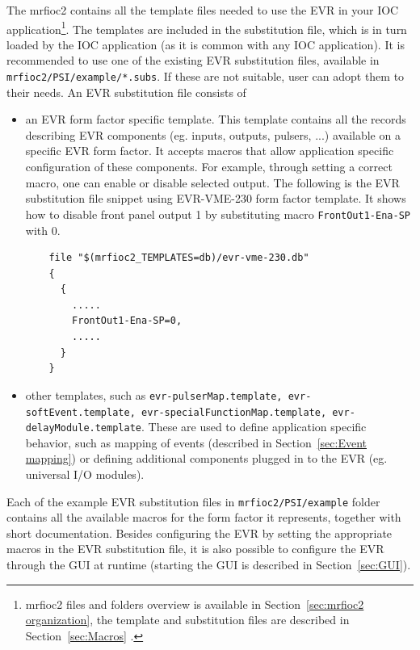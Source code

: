 \documentclass[12pt,a4paper]{article}
\begin{document}
The mrfioc2 contains all the template files needed to use the EVR in your IOC application\footnote{mrfioc2 files and folders overview is available in Section~\ref{sec:mrfioc2 organization}, the template and substitution files are described in Section~\ref{sec:Macros}
 .}. The templates are included in the substitution file, which is in turn loaded by the IOC application (as it is common with any IOC application). 
It is recommended to use one of the existing EVR substitution files, available in \texttt{mrfioc2/PSI/example/*.subs}. If these are not suitable, user can adopt them to their needs.
An EVR substitution file consists of
\begin{itemize}
	\item an EVR form factor specific template. This template contains all the records describing EVR components (eg. inputs, outputs, pulsers, ...) available on a specific EVR form factor. It accepts macros that allow application specific configuration of these components. For example, through setting a correct macro, one can enable or disable selected output. The following is the EVR substitution file snippet using EVR-VME-230 form factor template. It shows how to disable front panel output 1 by substituting macro \texttt{FrontOut1-Ena-SP} with 0.
	\begin{verbatim}
	file "$(mrfioc2_TEMPLATES=db)/evr-vme-230.db"
	{
	  {
	    .....
	    FrontOut1-Ena-SP=0,
	    .....
	  }
	}
	\end{verbatim}
	\item other templates, such as \texttt{evr-pulserMap.template, evr-softEvent.template, evr-specialFunctionMap.template, evr-delayModule.template}. These are used to define application specific behavior, such as mapping of events (described in Section~\ref{sec:Event mapping}) or defining additional components plugged in to the EVR (eg. universal I/O modules). 
\end{itemize}
Each of the example EVR substitution files in \texttt{mrfioc2/PSI/example} folder contains all the available macros for the form factor it represents, together with short documentation. Besides configuring the EVR by setting the appropriate macros in the EVR substitution file, it is also possible to configure the EVR through the GUI at runtime (starting the GUI is described in Section~\ref{sec:GUI}).
\end{document}
